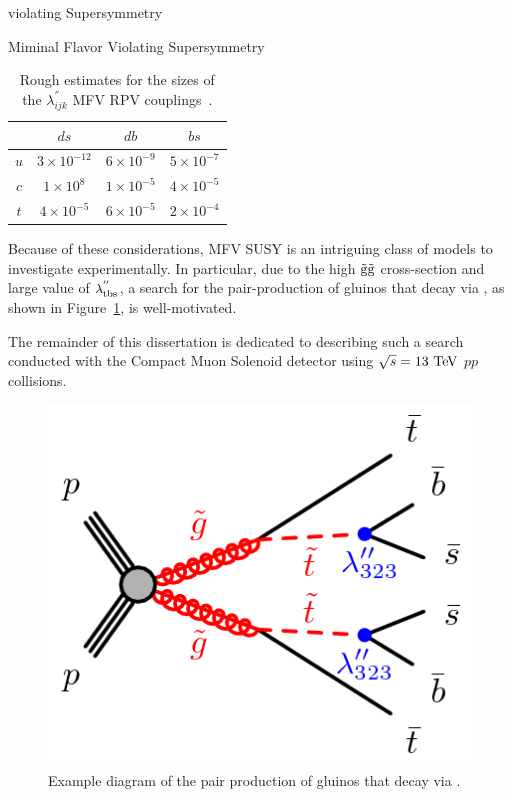 \begin{section}{\RP violating Supersymmetry}
\begin{subsection}{Miminal Flavor Violating Supersymmetry}
\begin{table}[tbp!]
\centering
\begin{tabular}{ |c|ccc| }
\hline
     &  $ds$                 &  $db$                &  $bs$               \\
\hline
$u$  &  $3 \times 10^{-12}$  &  $6 \times 10^{-9}$  &  $5 \times 10^{-7}$ \\
$c$  &  $1 \times 10^{8}$    &  $1 \times 10^{-5}$  &  $4 \times 10^{-5}$ \\
$t$  &  $4 \times 10^{-5}$   &  $6 \times 10^{-5}$  &  $2 \times 10^{-4}$ \\
\hline
\end{tabular}
\caption{Rough estimates for the sizes of the $\lambda^{''}_{ijk}$ MFV RPV couplings~\cite{Csaki:2011ge}.}
\label{tab:mfv_couplings}
\end{table}

Because of these considerations, MFV SUSY is an intriguing class of models to investigate experimentally.
In particular, due to the high $\tilde{\mathrm{g}}\tilde{\mathrm{g}}$ cross-section and large value of $\lambda^{''}_{\mathrm{t}\mathrm{b}\mathrm{s}}$, a search for the pair-production of gluinos that decay via \rpvDecay, as shown in Figure~\ref{fig:rpv_decay}, is well-motivated.

The remainder of this dissertation is dedicated to describing such a search conducted with the Compact Muon Solenoid detector using $\sqrt{s} = 13~\mathrm{Te\kern -0.1em V}$ $pp$ collisions.

\begin{figure}[tbp!]
\begin{center}
\includegraphics[angle=0,width=0.40\columnwidth]{fig/rpv_decay.png}
\end{center}
\caption{Example diagram of the pair production of gluinos that decay via \rpvDecay.}
\label{fig:rpv_decay}
\end{figure}

\end{subsection}

\end{section}
